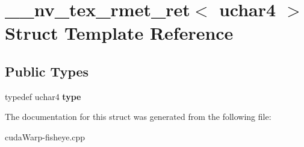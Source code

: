 \hypertarget{struct____nv__tex__rmet__ret_3_01uchar4_01_4}{}\section{\+\_\+\+\_\+nv\+\_\+tex\+\_\+rmet\+\_\+ret$<$ uchar4 $>$ Struct Template Reference}
\label{struct____nv__tex__rmet__ret_3_01uchar4_01_4}
\subsection*{Public Types}
\begin{DoxyCompactItemize}
\item 
typedef uchar4 {\bfseries type}\hypertarget{struct____nv__tex__rmet__ret_3_01uchar4_01_4_a4c98c91337d0031401cb3498f0a4c669}{}\label{struct____nv__tex__rmet__ret_3_01uchar4_01_4_a4c98c91337d0031401cb3498f0a4c669}

\end{DoxyCompactItemize}


The documentation for this struct was generated from the following file\+:\begin{DoxyCompactItemize}
\item 
cuda\+Warp-\/fisheye.\+cpp\end{DoxyCompactItemize}
